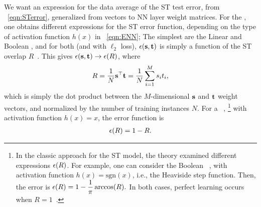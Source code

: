 We want an expression for the data average of the ST test error, from \EQN~\ref{eqn:STerror}, generalized from \Perceptron vectors to NN layer weight matrices.
For the \Perceptron, one obtains different expressions for the ST error function, depending on 
the type of activation function $h(x)$ in \EQN~\ref{eqn:ENN};
The simplest are the Linear and Boolean \Perceptrons, and
for both (and with $\ell_2$ loss),
 $\epsilon({\mathbf{s}},{\mathbf{t}})$ is simply a function of the ST overlap $R$~\cite{SST92}.
This gives $\epsilon({\mathbf{s}}, {\mathbf{t}} )\rightarrow\epsilon(R)$, where
\begin{align}
  \label{eqn:Rdef}
R=\frac{1}{N}{\mathbf{s}}^{\top}{\mathbf{t}}=\frac{1}{N}\sum_{i=1}^{M}s_{i}t_{i},
\end{align}
which is simply the dot product between the $M$-dimensional \Student ${\mathbf{s}}$ and \Teacher ${\mathbf{t}}$ weight vectors, and normalized by the number of training instances $N$.
For a \LinearPerceptron~\cite{SST92},%
\footnote{In the classic approach for the ST model, the theory examined different expressions $\epsilon(R)$.
For example, one can consider the  Boolean \Perceptron~\cite{SST92,Ros62}, with activation function $h(x)=\mbox{sgn}(x)$, 
i.e., the Heaviside step function. Then, the error is
$
\epsilon(R)=1 - \dfrac{1}{\pi}\arccos(R).
$
In both cases, perfect learning occurs when $R=1$~\cite{SST92}.
}
with activation function $h(x)=x$,  the error function is
\begin{align}
\epsilon(R)=1-R  .
\label{eqn:LinearPerceptronError}
\end{align}







